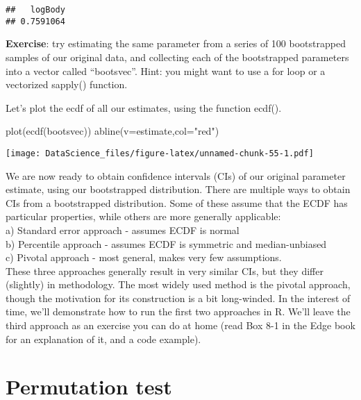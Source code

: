 \documentclass[
]{book}
\newenvironment{Shaded}{\begin{snugshade}}{\end{snugshade}}
\newcommand{\AttributeTok}[1]{\textcolor[rgb]{0.77,0.63,0.00}{#1}}
\newcommand{\FunctionTok}[1]{\textcolor[rgb]{0.00,0.00,0.00}{#1}}
\newcommand{\NormalTok}[1]{#1}
\newcommand{\StringTok}[1]{\textcolor[rgb]{0.31,0.60,0.02}{#1}}
\begin{document}
\begin{verbatim}
##   logBody 
## 0.7591064
\end{verbatim}

\textbf{Exercise}: try estimating the same parameter from a series of 100 bootstrapped samples of our original data, and collecting each of the bootstrapped parameters into a vector called ``bootsvec''. Hint: you might want to use a for loop or a vectorized sapply() function.

Let's plot the ecdf of all our estimates, using the function ecdf().

\begin{Shaded}
\begin{Highlighting}[]
\FunctionTok{plot}\NormalTok{(}\FunctionTok{ecdf}\NormalTok{(bootsvec))}
\FunctionTok{abline}\NormalTok{(}\AttributeTok{v=}\NormalTok{estimate,}\AttributeTok{col=}\StringTok{"red"}\NormalTok{)}
\end{Highlighting}
\end{Shaded}

\texttt{[image: DataScience\_files/figure-latex/unnamed-chunk-55-1.pdf]}

We are now ready to obtain confidence intervals (CIs) of our original parameter estimate, using our bootstrapped distribution. There are multiple ways to obtain CIs from a bootstrapped distribution. Some of these assume that the ECDF has particular properties, while others are more generally applicable:\\
a) Standard error approach - assumes ECDF is normal\\
b) Percentile approach - assumes ECDF is symmetric and median-unbiased\\
c) Pivotal approach - most general, makes very few assumptions.\\
These three approaches generally result in very similar CIs, but they differ (slightly) in methodology. The most widely used method is the pivotal approach, though the motivation for its construction is a bit long-winded. In the interest of time, we'll demonstrate how to run the first two approaches in R. We'll leave the third approach as an exercise you can do at home (read Box 8-1 in the Edge book for an explanation of it, and a code example).

\hypertarget{permutation-test}{%
\section{Permutation test}\label{permutation-test}}
\end{document}
